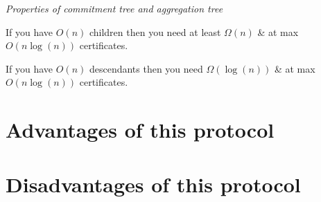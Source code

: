 \textit{Properties of commitment tree and aggregation tree}

	If you have $O(n)$ children then you need at least $\Omega(n)$ \& at max $O(n\log(n))$ certificates.

	If you have $O(n)$ descendants then you need $\Omega(\log(n))$  \& at max $O(n\log(n))$ certificates.


\section{Advantages of this protocol}
\section{Disadvantages of this protocol}
